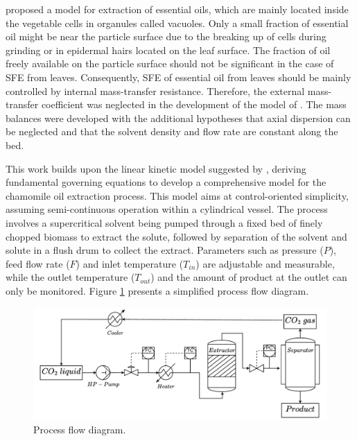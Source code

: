 \documentclass[../Article_Model_Parameters.tex]{subfiles}
\begin{document}
	\citet{Reverchon1996} proposed a model for extraction of essential oils, which are mainly located inside the vegetable cells in organules called vacuoles. Only a small fraction of essential oil might be near the particle surface due to the breaking up of cells during grinding or in epidermal hairs located on the leaf surface. The fraction of oil freely available on the particle surface should not be significant in the case of SFE from leaves. Consequently, SFE of essential oil from leaves should be mainly controlled by  internal mass-transfer resistance. Therefore, the external mass-transfer coefficient was neglected in the development of the model of \citet{Reverchon1996}. The mass balances were developed with the additional hypotheses that axial dispersion can be neglected and that the solvent density and flow rate are constant along the bed.
	
	This work builds upon the linear kinetic model suggested by \citet{Reverchon1996}, deriving fundamental governing equations to develop a comprehensive model for the chamomile oil extraction process. This model aims at control-oriented simplicity, assuming semi-continuous operation within a cylindrical vessel. The process involves a supercritical solvent being pumped through a fixed bed of finely chopped biomass to extract the solute, followed by separation of the solvent and solute in a flush drum to collect the extract. Parameters such as pressure ($P$), feed flow rate ($F$) and inlet temperature ($T_{in}$) are adjustable and measurable, while the outlet temperature ($T_{out}$) and the amount of product at the outlet can only be monitored. Figure \ref{fig: SFE_drawing} presents a simplified process flow diagram.
	
	\begin{figure}[h!]
		\centering
		\includegraphics[width=\columnwidth]{Figures/PFD.drawio.pdf}
		\caption{Process flow diagram.}
		\label{fig: SFE_drawing}
	\end{figure}
	
\end{document}
